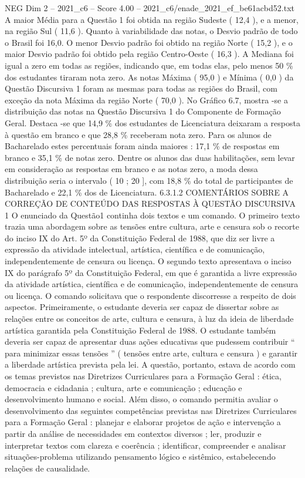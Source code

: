 \begin{textsample}{NEG Dim 2 – 2021\_c6 – Score 4.00 – 2021\_c6/enade\_2021\_ef\_be61acbd52.txt}
A maior Média para a Questão 1 foi obtida na região Sudeste ( 12,4 ), e a menor, na região Sul ( 11,6 ).
Quanto à variabilidade das notas, o Desvio padrão de todo o Brasil foi 16,0.
O menor Desvio padrão foi obtido na região Norte ( 15,2 ), e o maior Desvio padrão foi obtido pela região Centro-Oeste ( 16,3 ).
A Mediana foi igual a zero em todas as regiões, indicando que, em todas elas, pelo menos 50 \% dos estudantes tiraram nota zero.
As notas Máxima ( 95,0 ) e Mínima ( 0,0 ) da Questão Discursiva 1 foram as mesmas para todas as regiões do Brasil, com exceção da nota Máxima da região Norte ( 70,0 ).
No Gráfico 6.7, mostra -se a distribuição das notas na Questão Discursiva 1 do Componente de Formação Geral.
Destaca -se que 14,9 \% dos estudantes de Licenciatura deixaram a resposta à questão em branco e que 28,8 \% receberam nota zero.
Para os alunos de Bacharelado estes percentuais foram ainda maiores : 17,1 \% de respostas em branco e 35,1 \% de notas zero.
Dentre os alunos das duas habilitações, sem levar em consideração as respostas em branco e as notas zero, a moda dessa distribuição seria o intervalo ( 10 ; 20 ], com 18,8 \% do total de participantes de Bacharelado e 22,1 \% dos de Licenciatura. 6.3.1.2 COMENTÁRIOS SOBRE A CORREÇÃO DE CONTEÚDO DAS RESPOSTAS À QUESTÃO DISCURSIVA 1 O enunciado da Questão1 continha dois textos e um comando.
O primeiro texto trazia uma abordagem sobre as tensões entre cultura, arte e censura sob o recorte do inciso IX do Art. 5º da Constituição Federal de 1988, que diz ser livre a expressão da atividade intelectual, artística, científica e de comunicação, independentemente de censura ou licença.
O segundo texto apresentava o inciso IX do parágrafo 5º da Constituição Federal, em que é garantida a livre expressão da atividade artística, científica e de comunicação, independentemente de censura ou licença.
O comando solicitava que o respondente discorresse a respeito de dois aspectos.
Primeiramente, o estudante deveria ser capaz de dissertar sobre as relações entre os conceitos de arte, cultura e censura, à luz da ideia de liberdade artística garantida pela Constituição Federal de 1988.
O estudante também deveria ser capaz de apresentar duas ações educativas que pudessem contribuir “ para minimizar essas tensões ” ( tensões entre arte, cultura e censura ) e garantir a liberdade artística prevista pela lei.
A questão, portanto, estava de acordo com os temas previstos nas Diretrizes Curriculares para a Formação Geral : ética, democracia e cidadania ; cultura, arte e comunicação ; educação e desenvolvimento humano e social.
Além disso, o comando permitia avaliar o desenvolvimento das seguintes competências previstas nas Diretrizes Curriculares para a Formação Geral : planejar e elaborar projetos de ação e intervenção a partir da análise de necessidades em contextos diversos ; ler, produzir e interpretar textos com clareza e coerência ; identificar, compreender e analisar situações-problema utilizando pensamento lógico e sistêmico, estabelecendo relações de causalidade.

\end{textsample}
